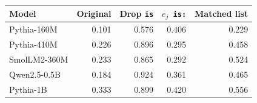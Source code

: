\begin{tabular}{@{}lrrrr@{}}
\toprule
Model & Original & Drop \texttt{is} & $e_j$\texttt{ is:} & Matched list \\
\midrule
Pythia-160M & 0.101 & 0.576 & 0.406 & 0.229 \\
Pythia-410M & 0.226 & 0.896 & 0.295 & 0.458 \\
SmolLM2-360M & 0.233 & 0.865 & 0.292 & 0.524 \\
Qwen2.5-0.5B & 0.184 & 0.924 & 0.361 & 0.465 \\
Pythia-1B & 0.333 & 0.899 & 0.420 & 0.556 \\
\bottomrule
\end{tabular}

